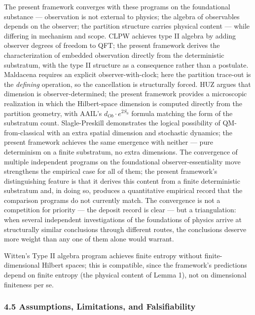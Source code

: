 \documentclass[
]{article}
\begin{document}
The present framework converges with these programs on the foundational
substance --- observation is not external to physics; the algebra of
observables depends on the observer; the partition structure carries
physical content --- while differing in mechanism and scope. CLPW
achieves type II algebra by adding observer degrees of freedom to QFT;
the present framework derives the characterization of embedded
observation directly from the deterministic substratum, with the type II
structure as a consequence rather than a postulate. Maldacena requires
an explicit observer-with-clock; here the partition trace-out is the
\emph{defining} operation, so the cancellation is structurally forced.
HUZ argues that dimension is observer-determined; the present framework
provides a microscopic realization in which the Hilbert-space dimension
is computed directly from the partition geometry, with AAIL's
\(d_{Ob} \cdot e^{2S_0}\) formula matching the form of the substratum
count. Slagle-Preskill demonstrates the logical possibility of
QM-from-classical with an extra spatial dimension and stochastic
dynamics; the present framework achieves the same emergence with neither
--- pure determinism on a finite substratum, no extra dimensions. The
convergence of multiple independent programs on the foundational
observer-essentiality move strengthens the empirical case for all of
them; the present framework's distinguishing feature is that it derives
this content from a finite deterministic substratum and, in doing so,
produces a quantitative empirical record that the comparison programs do
not currently match. The convergence is not a competition for priority
--- the deposit record is clear --- but a triangulation: when several
independent investigations of the foundations of physics arrive at
structurally similar conclusions through different routes, the
conclusions deserve more weight than any one of them alone would
warrant.

Witten's Type II algebra program achieves finite entropy without
finite-dimensional Hilbert spaces; this is compatible, since the
framework's predictions depend on finite entropy (the physical content
of Lemma 1), not on dimensional finiteness per se.

\hypertarget{assumptions-limitations-and-falsifiability}{%
\subsubsection{4.5 Assumptions, Limitations, and
Falsifiability}\label{assumptions-limitations-and-falsifiability}}
\end{document}

